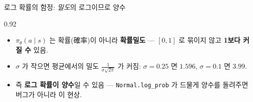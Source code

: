 \begin{frame}{로그 확률의 함정: \emph{밀도}의 로그이므로 양수}
\begin{center}\begin{varwidth}{0.92\textwidth}
  
  \begin{itemize}
    \item $\pi_\theta(a\mid s)$ 는 확률(確率)이 아니라 \textbf{확률밀도} ---
      $[0,1]$ 로 묶이지 않고 \textbf{1보다 커질 수} 있음.
    \item $\sigma$ 가 작으면 평균에서의 밀도 $\tfrac{1}{\sigma\sqrt{2\pi}}$ 가
      커짐: $\sigma=0.25$ 면 $1.596$, $\sigma=0.1$ 면 $3.99$.
    \item 즉 \textbf{로그 확률이 양수}일 수 있음 ---
      \texttt{Normal.log\_prob} 가 드물게 양수를 돌려주면 버그가 아니라
      이 현상.
  \end{itemize}
\end{varwidth}\end{center}
\end{frame}
